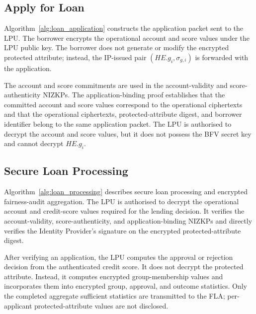 \documentclass[a4paper,fleqn]{cas-dc}
\begin{document}
\subsection{Apply for Loan} 

Algorithm~\ref{alg:loan_application} constructs the application packet sent to the LPU. The borrower encrypts the operational account and score values under the LPU public key. The borrower does not generate or modify the encrypted protected attribute; instead, the IP-issued pair $(HE.g_i,\sigma_{g,i})$ is forwarded with the application. 

The account and score commitments are used in the account-validity and score-authenticity NIZKPs. The application-binding proof establishes that the committed account and score values correspond to the operational ciphertexts and that the operational ciphertexts, protected-attribute digest, and borrower identifier belong to the same application packet. The LPU is authorised to decrypt the account and score values, but it does not possess the BFV secret key and cannot decrypt $HE.g_i$.


\subsection{Secure Loan Processing}

Algorithm~\ref{alg:loan_processing} describes secure loan processing and encrypted fairness-audit aggregation. The LPU is authorised to decrypt the
operational account and credit-score values required for the lending decision.
It verifies the account-validity, score-authenticity, and application-binding
NIZKPs and directly verifies the Identity Provider's signature on the encrypted protected-attribute digest.

After verifying an application, the LPU computes the approval or rejection decision from the authenticated credit score. It does not decrypt the protected attribute. Instead, it computes encrypted group-membership values
and incorporates them into encrypted group, approval, and outcome statistics. Only the completed aggregate sufficient statistics are transmitted to the
FLA; per-applicant protected-attribute values are not disclosed.
\end{document}
